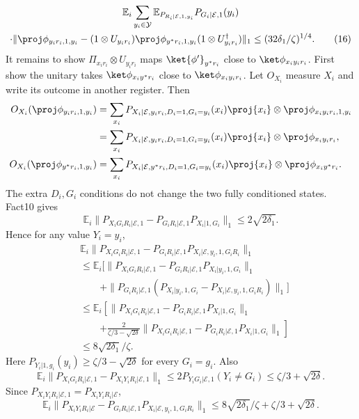 \begin{multline*}\mathbb E_i\sum_{y_i\in\mathcal Y}\mathbb E_{P_{R_i|\mathcal E,1,y_i}}P_{G_i|\mathcal E,1}(y_i)\\\cdot\|\proj\phi_{y_ir_i,1,y_i}-(1\otimes U_{y_ir_i})\proj\phi_{y^*r_i,1,y_i}(1\otimes U_{y_ir_i}^\dagger)\|_1\le(32\delta_1/\zeta)^{1/4}.\tag{16}\end{multline*}
It remains to show $\Pi_{x_ir_i}\otimes U_{y_ir_i}$ maps $\ket{\phi'}_{y^*r_i}$ close to $\ket\phi_{x_iy_ir_i}$. First show the unitary takes $\ket\phi_{x_iy^*r_i}$ close to $\ket\phi_{x_iy_ir_i}$. Let $O_{X_i}$ measure $X_i$ and write its outcome in another register. Then
\begin{align*}O_{X_i}(\proj\phi_{y_ir_i,1,y_i})&=\sum_{x_i}P_{X_i|\mathcal E,y_ir_i,D_i=1,G_i=y_i}(x_i)\proj{x_i}\otimes\proj\phi_{x_iy_ir_i,1,y_i}\\&=\sum_{x_i}P_{X_i|\mathcal E,y_ir_i,D_i=1,G_i=y_i}(x_i)\proj{x_i}\otimes\proj\phi_{x_iy_ir_i},\\O_{X_i}(\proj\phi_{y^*r_i,1,y_i})&=\sum_{x_i}P_{X_i|\mathcal E,y^*r_i,D_i=1,G_i=y_i}(x_i)\proj{x_i}\otimes\proj\phi_{x_iy^*r_i}.\end{align*}
The extra $D_i,G_i$ conditions do not change the two fully conditioned states. Fact10 gives
\[\mathbb E_i\|P_{X_iG_iR_i|\mathcal E,1}-P_{G_iR_i|\mathcal E,1}P_{X_i|1,G_i}\|_1\le2\sqrt{2\delta_1}.\]
Hence for any value $Y_i=y_i$,
\begin{align*}&\mathbb E_i\|P_{X_iG_iR_i|\mathcal E,1}-P_{G_iR_i|\mathcal E,1}P_{X_i|\mathcal E,y_i,1,G_iR_i}\|_1\\&\le\mathbb E_i[\|P_{X_iG_iR_i|\mathcal E,1}-P_{G_iR_i|\mathcal E,1}P_{X_i|y_i,1,G_i}\|_1\\&\qquad+\|P_{G_iR_i|\mathcal E,1}(P_{X_i|y_i,1,G_i}-P_{X_i|\mathcal E,y_i,1,G_iR_i})\|_1]\\&\le\mathbb E_i\left[\|P_{X_iG_iR_i|\mathcal E,1}-P_{G_iR_i|\mathcal E,1}P_{X_i|1,G_i}\|_1\right.\\&\qquad\left.+\frac2{\zeta/3-\sqrt{2\delta}}\|P_{X_iG_iR_i|\mathcal E,1}-P_{G_iR_i|\mathcal E,1}P_{X_i|1,G_i}\|_1\right]\\&\le8\sqrt{2\delta_1}/\zeta.
\end{align*}
Here $P_{Y_i|1,g_i}(y_i)\ge\zeta/3-\sqrt{2\delta}$ for every $G_i=g_i$. Also
\[\mathbb E_i\|P_{X_iG_iR_i|\mathcal E,1}-P_{X_iY_iR_i|\mathcal E,1}\|_1\le2P_{Y_iG_i|\mathcal E,1}(Y_i\ne G_i)\le\zeta/3+\sqrt{2\delta}.\]
Since $P_{X_iY_iR_i|\mathcal E,1}=P_{X_iY_iR_i|\mathcal E}$,
\[\mathbb E_i\|P_{X_iY_iR_i|\mathcal E}-P_{G_iR_i|\mathcal E,1}P_{X_i|\mathcal E,y_i,1,G_iR_i}\|_1\le8\sqrt{2\delta_1}/\zeta+\zeta/3+\sqrt{2\delta}.\]
